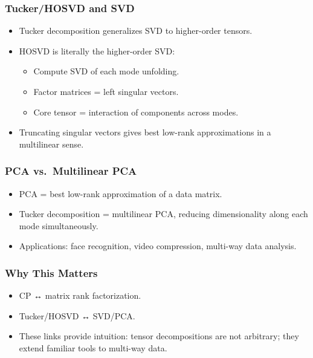 \documentclass[
  letterpaper,
  DIV=11,
  numbers=noendperiod]{scrreprt}
\providecommand{\tightlist}{%
  \setlength{\itemsep}{0pt}\setlength{\parskip}{0pt}}
\begin{document}
\subsubsection{Tucker/HOSVD and SVD}\label{tuckerhosvd-and-svd}

\begin{itemize}
\item
  Tucker decomposition generalizes SVD to higher-order tensors.
\item
  HOSVD is literally the higher-order SVD:

  \begin{itemize}
  \tightlist
  \item
    Compute SVD of each mode unfolding.
  \item
    Factor matrices = left singular vectors.
  \item
    Core tensor = interaction of components across modes.
  \end{itemize}
\item
  Truncating singular vectors gives best low-rank approximations in a
  multilinear sense.
\end{itemize}

\subsubsection{PCA vs.~Multilinear PCA}\label{pca-vs.-multilinear-pca}

\begin{itemize}
\tightlist
\item
  PCA = best low-rank approximation of a data matrix.
\item
  Tucker decomposition = multilinear PCA, reducing dimensionality along
  each mode simultaneously.
\item
  Applications: face recognition, video compression, multi-way data
  analysis.
\end{itemize}

\subsubsection{Why This Matters}\label{why-this-matters-38}

\begin{itemize}
\tightlist
\item
  CP ↔ matrix rank factorization.
\item
  Tucker/HOSVD ↔ SVD/PCA.
\item
  These links provide intuition: tensor decompositions are not
  arbitrary; they extend familiar tools to multi-way data.
\end{itemize}
\end{document}

